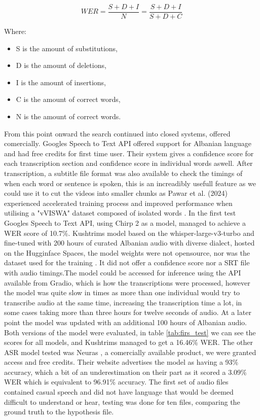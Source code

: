 \documentclass[12pt]{article}
\begin{document}
\begin{equation}
\label{eq:WER}
WER = \frac{S + D + I}{N} = \frac{S + D + I}{S + D + C}
\end{equation}

Where:
\begin{itemize}
    \item S is the amount of substitutions,
    \item D is the amount of deletions,
    \item I is the amount of insertions,
    \item C is the amount of correct words,
    \item N is the amount of correct words.
\end{itemize}

From this point onward the search continued into closed systems, offered comercially. Googles Speech to Text API offered support for Albanian language and had free credits for first time user. Their system gives a confidence score for each transcription section and confidence score in individual words aswell. After transcription, a subtitle file format was also available to check the timings of when each word or sentence is spoken, this is an increadibly usefull feature as we could use it to cut the videos into smaller chunks as Pawar et al. (2024) experienced accelerated training process and improved performance when utilising a "vVISWA" dataset composed of isolated words \cite{PAWAR2024100084}. In the first test Googles Speech to Text API, using Chirp 2 as a model, managed to achieve a WER score of 10.7\%. Kushtrims model based on the whisper-large-v3-turbo and fine-tuned with 200 hours of curated Albanian audio with diverse dialect, hosted on the Hugginface Spaces, the model weights were not opensource, nor was the dataset used for the training \cite{kushtrim}. It did not offer a confidence score nor a SRT file with audio timings.The model could be accessed for inference using the API available from Gradio, which is how the transcriptions were processed, however the model was quite slow in times as more than one individual would try to transcribe audio at the same time, increasing the transcription time a lot, in some cases taking more than three hours for twelve seconds of audio. At a later point the model was updated with an additional 100 hours of Albanian audio. Both versions of the model were evaluated, in table \ref{tab:firs_test} we can see the scores for all models, and Kushtrims managed to get a 16.46\% WER. The other ASR model tested was Neuras \cite{neura}, a comercially available product, we were granted access and free credits. Their website advertises the model as having a 93\% accuracy, which a bit of an underestimation on their part as it scored a 3.09\% WER which is equivalent to 96.91\% accuracy. The first set of audio files contained casual speech and did not have language that would be deemed difficult to understand or hear, testing was done for ten files, comparing the ground truth to the hypothesis file.\\
\end{document}
